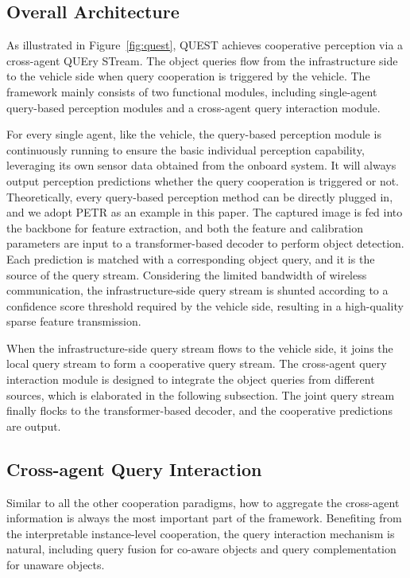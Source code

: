 \documentclass[letterpaper, 10 pt, conference]{ieeeconf}  %
\begin{document}
\subsection{Overall Architecture}

As illustrated in Figure~\ref{fig:quest}, QUEST achieves cooperative perception via a cross-agent QUEry STream. The object queries flow from the infrastructure side to the vehicle side when query cooperation is triggered by the vehicle. The framework mainly consists of two functional modules, including single-agent query-based perception modules and a cross-agent query interaction module.

For every single agent, like the vehicle, the query-based perception module is continuously running to ensure the basic individual perception capability, leveraging its own sensor data obtained from the onboard system. It will always output perception predictions whether the query cooperation is triggered or not. Theoretically, every query-based perception method can be directly plugged in, and we adopt PETR \cite{petr} as an example in this paper. The captured image is fed into the backbone for feature extraction, and both the feature and calibration parameters are input to a transformer-based decoder to perform object detection. Each prediction is matched with a corresponding object query, and it is the source of the query stream. Considering the limited bandwidth of wireless communication, the infrastructure-side query stream is shunted according to a confidence score threshold required by the vehicle side, resulting in a high-quality sparse feature transmission.

When the infrastructure-side query stream flows to the vehicle side, it joins the local query stream to form a cooperative query stream. The cross-agent query interaction module is designed to integrate the object queries from different sources, which is elaborated in the following subsection. The joint query stream finally flocks to the transformer-based decoder, and the cooperative predictions are output.


\subsection{Cross-agent Query Interaction}

Similar to all the other cooperation paradigms, how to aggregate the cross-agent information is always the most important part of the framework. Benefiting from the interpretable instance-level cooperation, the query interaction mechanism is natural, including query fusion for co-aware objects and query complementation for unaware objects. 
\end{document}

